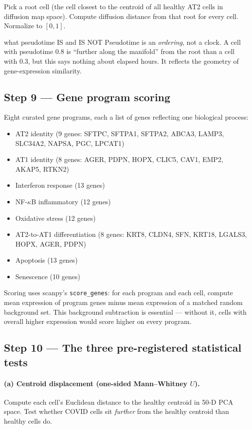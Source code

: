 \documentclass[11pt]{article}
\begin{document}
Pick a root cell (the cell closest to the centroid of all healthy AT2 cells in diffusion map space). Compute diffusion distance from that root for every cell. Normalize to $[0,1]$.

\begin{jargon}{what pseudotime IS and IS NOT}
Pseudotime is an \emph{ordering}, not a clock. A cell with pseudotime 0.8 is ``further along the manifold'' from the root than a cell with 0.3, but this says nothing about elapsed hours. It reflects the geometry of gene-expression similarity.
\end{jargon}

\subsection{Step 9 --- Gene program scoring}

Eight curated gene programs, each a list of genes reflecting one biological process:

\begin{itemize}
\item AT2 identity (9 genes: SFTPC, SFTPA1, SFTPA2, ABCA3, LAMP3, SLC34A2, NAPSA, PGC, LPCAT1)
\item AT1 identity (8 genes: AGER, PDPN, HOPX, CLIC5, CAV1, EMP2, AKAP5, RTKN2)
\item Interferon response (13 genes)
\item NF-$\kappa$B inflammatory (12 genes)
\item Oxidative stress (12 genes)
\item AT2-to-AT1 differentiation (8 genes: KRT8, CLDN4, SFN, KRT18, LGALS3, HOPX, AGER, PDPN)
\item Apoptosis (13 genes)
\item Senescence (10 genes)
\end{itemize}

Scoring uses scanpy's \texttt{score\_genes}: for each program and each cell, compute mean expression of program genes minus mean expression of a matched random background set. This background subtraction is essential --- without it, cells with overall higher expression would score higher on every program.

\subsection{Step 10 --- The three pre-registered statistical tests}

\paragraph{(a) Centroid displacement (one-sided Mann--Whitney $U$).}
Compute each cell's Euclidean distance to the healthy centroid in 50-D PCA space. Test whether COVID cells sit \emph{further} from the healthy centroid than healthy cells do.
\end{document}
